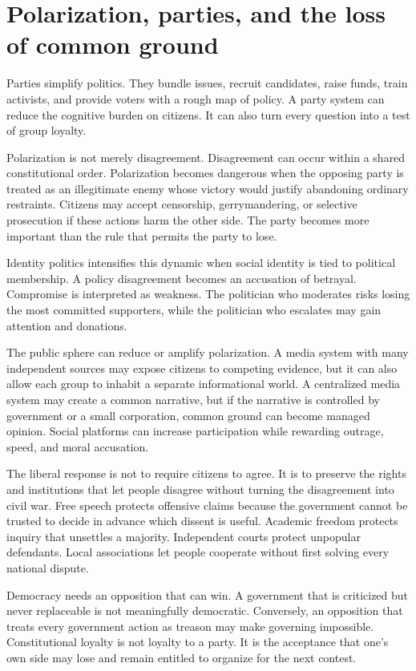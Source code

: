 ﻿\documentclass[12pt,a4paper]{book}
\begin{document}
\section{Polarization, parties, and the loss of common ground}

Parties simplify politics.  They bundle issues, recruit candidates, raise
funds, train activists, and provide voters with a rough map of policy.  A
party system can reduce the cognitive burden on citizens.  It can also turn
every question into a test of group loyalty.

Polarization is not merely disagreement.  Disagreement can occur within a
shared constitutional order.  Polarization becomes dangerous when the
opposing party is treated as an illegitimate enemy whose victory would
justify abandoning ordinary restraints.  Citizens may accept censorship,
gerrymandering, or selective prosecution if these actions harm the other
side.  The party becomes more important than the rule that permits the party
to lose.

Identity politics intensifies this dynamic when social identity is tied to
political membership.  A policy disagreement becomes an accusation of
betrayal.  Compromise is interpreted as weakness.  The politician who
moderates risks losing the most committed supporters, while the politician
who escalates may gain attention and donations.

The public sphere can reduce or amplify polarization.  A media system with
many independent sources may expose citizens to competing evidence, but it
can also allow each group to inhabit a separate informational world.  A
centralized media system may create a common narrative, but if the narrative
is controlled by government or a small corporation, common ground can become
managed opinion.  Social platforms can increase participation while
rewarding outrage, speed, and moral accusation.

The liberal response is not to require citizens to agree.  It is to preserve
the rights and institutions that let people disagree without turning the
disagreement into civil war.  Free speech protects offensive claims because
the government cannot be trusted to decide in advance which dissent is
useful.  Academic freedom protects inquiry that unsettles a majority.
Independent courts protect unpopular defendants.  Local associations let
people cooperate without first solving every national dispute.

Democracy needs an opposition that can win.  A government that is criticized
but never replaceable is not meaningfully democratic.  Conversely, an
opposition that treats every government action as treason may make governing
impossible.  Constitutional loyalty is not loyalty to a party.  It is the
acceptance that one's own side may lose and remain entitled to organize for
the next contest.
\end{document}
